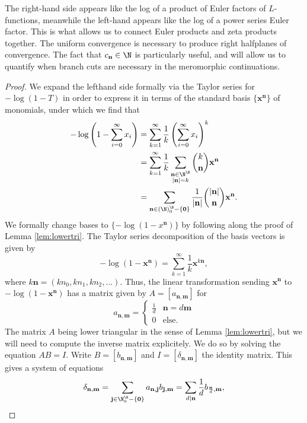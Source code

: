 \documentclass[12pt]{amsart}
\theoremstyle{plain}
\begin{document}
The right-hand side appears like the log of a product of Euler factors of $L$-functions, meanwhile the left-hand appears like the log of a power series Euler factor. This is what allows us to connect Euler products and zeta products together. The uniform convergence is necessary to produce right halfplanes of convergence. The fact that $c_{\mathbf{n}}\in \N$ is particularly useful, and will allow us to quantify when branch cuts are necessary in the meromorphic continuations.

\begin{proof}
We expand the lefthand side formally via the Taylor series for $-\log(1-T)$ in order to express it in terms of the standard basis $\{\mathbf{x}^\mathbf{n}\}$ of monomials, under which we find that
\begin{align*}
    -\log\left(1 - \sum_{i=0}^\infty x_i\right) &= \sum_{k=1}^{\infty}\frac{1}{k}\left(\sum_{i=0}^\infty x_i\right)^{k}\\
    &=\sum_{k=1}^{\infty}\frac{1}{k}\sum_{\substack{\mathbf{n}\in \N^\N\\|\mathbf{n}|=k}}{k\choose \mathbf{n}}\mathbf{x}^\mathbf{n}\\
    &=\sum_{\mathbf{n}\in (\N)^{\N}_0-\{\mathbf{0}\}} \frac{1}{|\mathbf{n}|}{|\mathbf{n}|\choose \mathbf{n}} \mathbf{x}^\mathbf{n}.
\end{align*}
We formally change bases to $\{-\log(1 - x^\mathbf{n})\}$ by following along the proof of Lemma \ref{lem:lowertri}. The Taylor series decomposition of the basis vectors is given by
\[
-\log(1 - \mathbf{x}^\mathbf{n}) = \sum_{k=1}^{\infty} \frac{1}{k} \mathbf{x}^{k\mathbf{n}},
\]
where $k\mathbf{n}=(kn_0,kn_1,kn_2,...)$. Thus, the linear transformation sending $\mathbf{x}^\mathbf{n}$ to $-\log(1-\mathbf{x}^\mathbf{n})$ has a matrix given by $A=[a_{\mathbf{n},\mathbf{m}}]$ for
\[
a_{\mathbf{n},\mathbf{m}} = \begin{cases}
\frac{1}{d} & \mathbf{n} = d\mathbf{m}\\
0 & \text{else}.
\end{cases}
\]
The matrix $A$ being lower triangular in the sense of Lemma \ref{lem:lowertri}, but we will need to compute the inverse matrix explicitely. We do so by solving the equation $AB = I$. Write $B=[b_{\mathbf{n},\mathbf{m}}]$ and $I = [\delta_{\mathbf{n},\mathbf{m}}]$ the identity matrix. This gives a system of equations
\[
\delta_{\mathbf{n},\mathbf{m}} = \sum_{\mathbf{j}\in \N^{\N}_0-\{\mathbf{0}\}} a_{\mathbf{n},\mathbf{j}}b_{\mathbf{j},\mathbf{m}} = \sum_{d\mid \mathbf{n}} \frac{1}{d} b_{\frac{\mathbf{n}}{d},\mathbf{m}},
\]
\end{proof}
\end{document}
